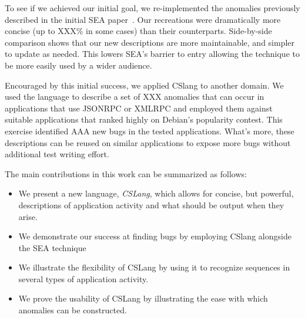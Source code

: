 


To see if we achieved our initial goal, we re-implemented the
anomalies previously described in the initial SEA paper~\cite{crashsim}.
Our recreations were dramatically more concise (up to XXX\% in some cases)
than their counterparts.  Side-by-side comparison shows that our new
descriptions are
more maintainable,
and simpler to update as needed.
This lowers SEA's barrier to entry allowing the
technique to be more easily used by a wider audience.


Encouraged by this initial success,
we applied CSlang to another domain.
We used the language to describe a set of XXX anomalies that can occur in
applications that use JSONRPC or XMLRPC and employed them against
suitable
applications that ranked highly on Debian's popularity contest.  This
exercise identified AAA new bugs in the tested applications.
What's more, these descriptions can be reused on
similar applications to expose more
bugs without additional test writing effort.

The main contributions in this work can be summarized as follows:

\begin{itemize}

\item{We present a new language, {\em CSLang},
  which allows for concise, but powerful, descriptions of
    application activity and what should be output when they arise.}


\item{We demonstrate our success at finding bugs by employing CSlang
  alongside the SEA technique}

\item{We illustrate the flexibility of CSLang by using it to recognize
  sequences in several types of application activity.}

\item{We prove the usability of CSLang by illustrating the ease with which
  anomalies can be constructed.}


\end{itemize}

